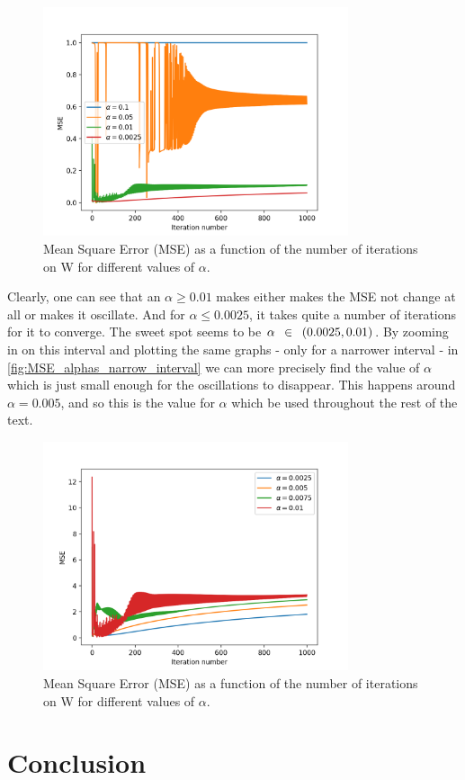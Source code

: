 \documentclass{article}
\begin{document}
\begin{figure}
    \centering
    \includegraphics[width=0.8\textwidth]{../images/MSE_alphas_large_interval.png}
    \caption{Mean Square Error (MSE) as a function of the number of iterations on W for different values
    of $\alpha$.}
    \label{fig:MSE_alphas_large_interval}
\end{figure}

Clearly, one can see that an $\alpha \geq 0.01$ makes either makes the MSE not change at all
or makes it oscillate. And for $\alpha \leq 0.0025$, it takes quite a number of iterations
for it to converge. The sweet spot seems to be $\alpha \enskip \in \enskip ( 0.0025, 0.01)$.
By zooming in on this interval and plotting the same graphs - only for a narrower interval - in
\autoref{fig:MSE_alphas_narrow_interval} we can more precisely find the value of $\alpha$ which
is just small enough for the oscillations to disappear. This happens around $\alpha = 0.005$,
and so this is the value for $\alpha$ which be used throughout the rest of the text.

\begin{figure}
    \centering
    \includegraphics[width=0.8\textwidth]{../images/MSE_alphas_narrow_interval.png}
    \caption{Mean Square Error (MSE) as a function of the number of iterations on W for different values
    of $\alpha$.}
    \label{fig:MSE_alphas_narrow_interval}
\end{figure}



\section{Conclusion}
\end{document}
